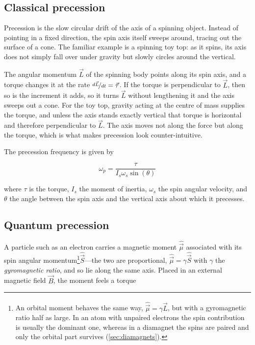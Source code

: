     \subsection{Classical precession}

        Precession is the slow circular drift of the axis of a spinning object. Instead of pointing in a fixed direction, the spin axis itself sweeps around, tracing out the surface of a cone. The familiar example is a spinning toy top: as it spins, its axis does not simply fall over under gravity but slowly circles around the vertical.

        The angular momentum $\vec{L}$ of the spinning body points along its spin axis, and a torque changes it at the rate $\nicefrac{d\vec{L}}{dt} = \vec{\tau}$. If the torque is perpendicular to $\vec{L}$, then so is the increment it adds, so it turns $\vec{L}$ without lengthening it and the axis sweeps out a cone. For the toy top, gravity acting at the centre of mass supplies the torque, and unless the axis stands exactly vertical that torque is horizontal and therefore perpendicular to $\vec{L}$. The axis moves not along the force but along the torque, which is what makes precession look counter-intuitive.

        The precession frequency is given by

        \begin{equation*}
            \omega_p = \frac{\tau}{I_s\omega_s\sin(\theta)}
        \end{equation*}

        where $\tau$ is the torque, $I_s$ the moment of inertia, $\omega_s$ the spin angular velocity, and $\theta$ the angle between the spin axis and the vertical axis about which it precesses.

    \subsection{Quantum precession}
    \label{subsec:quantum-precession}

        A particle such as an electron carries a magnetic moment $\hat{\vec{\mu}}$ associated with its spin angular momentum\footnote{
        An orbital moment behaves the same way, $\hat{\vec{\mu}} = \gamma\hat{\vec{L}}$, but with a gyromagnetic ratio half as large. In an atom with unpaired electrons the spin contribution is usually the dominant one, whereas in a diamagnet the spins are paired and only the orbital part survives (\cref{sec:diamagnets}).
        }$\hat{\vec{S}}$---the two are proportional, $\hat{\vec{\mu}} = \gamma\hat{\vec{S}}$ with $\gamma$ the \emph{gyromagnetic ratio}, and so lie along the same axis. Placed in an external magnetic field $\vec{B}$, the moment feels a torque

